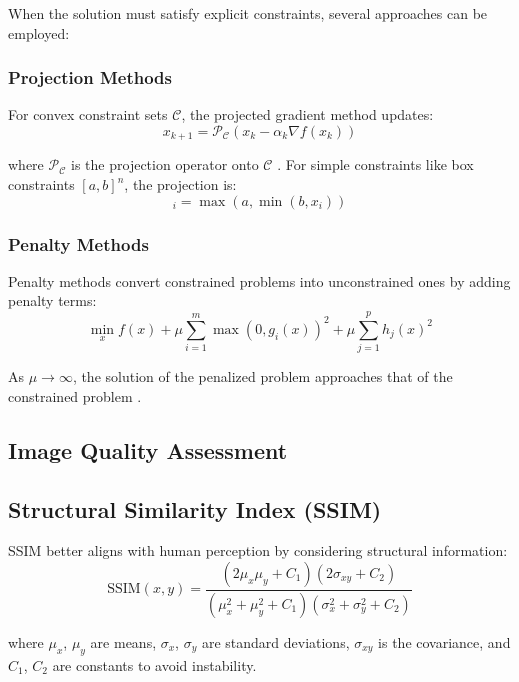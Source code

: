 \documentclass[nomenclature, english, bibtex]{kththesis}
\numberwithin{listing}{chapter}
\begin{document}
When the solution must satisfy explicit constraints, several approaches can be employed:

\subsubsection{Projection Methods}
For convex constraint sets $\mathcal{C}$, the projected gradient method updates:
\begin{equation}
x_{k+1} = \mathcal{P}_\mathcal{C}(x_k - \alpha_k \nabla f(x_k))
\end{equation}

where $\mathcal{P}_\mathcal{C}$ is the projection operator onto $\mathcal{C}$ \cite{bertsekas1999nonlinear}. For simple constraints like box constraints $[a, b]^n$, the projection is:
\begin{equation}
[\mathcal{P}_{[a,b]^n}(x)]_i = \max(a, \min(b, x_i))
\end{equation}

\subsubsection{Penalty Methods}
Penalty methods convert constrained problems into unconstrained ones by adding penalty terms:
\begin{equation}
\min_x f(x) + \mu \sum_{i=1}^m \max(0, g_i(x))^2 + \mu \sum_{j=1}^p h_j(x)^2
\end{equation}

As $\mu \to \infty$, the solution of the penalized problem approaches that of the constrained problem \cite{nocedal2006numerical}.

\subsection{Image Quality Assessment}
\label{sec:image_quality_assessment}

\subsection{Structural Similarity Index (SSIM)}
SSIM \cite{wang2004image} better aligns with human perception by considering structural information:
\begin{equation}
\text{SSIM}(x, y) = \frac{(2\mu_x\mu_y + C_1)(2\sigma_{xy} + C_2)}{(\mu_x^2 + \mu_y^2 + C_1)(\sigma_x^2 + \sigma_y^2 + C_2)}
\end{equation}

where $\mu_x$, $\mu_y$ are means, $\sigma_x$, $\sigma_y$ are standard deviations, $\sigma_{xy}$ is the covariance, and $C_1$, $C_2$ are constants to avoid instability.
\end{document}

